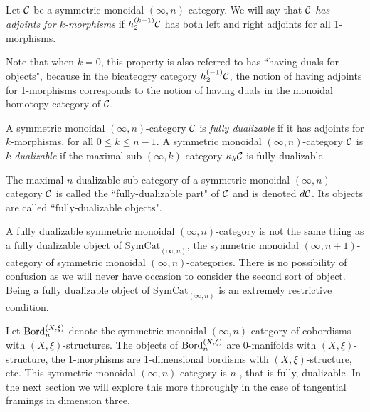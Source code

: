 \documentclass{amsart}
\begin{document}
\begin{definition}
	Let $\mathcal C$ be a symmetric monoidal $(\infty,n)$-category. We will say that $\mathcal C$ {\em has adjoints for $k$-morphisms} if $h^{(k-1)}_2 \mathcal C$ has both left and right adjoints for all 1-morphisms. 
\end{definition}
Note that when $k=0$, this property is also referred to has ``having duals for objects", because in the bicateogry category $h^{(-1)}_2 \mathcal C$, the notion of having adjoints for 1-morphisms corresponds to the notion of having duals in the monoidal homotopy category of $\mathcal C$.

\begin{definition}
A symmetric monoidal $(\infty,n)$-category $\mathcal C$ is \emph{fully dualizable} if it has adjoints for $k$-morphisms, for all $0 \leq k \leq n-1$.
A symmetric monoidal $(\infty,n)$-category $\mathcal C$ is \emph{$k$-dualizable} if the maximal sub-$(\infty,k)$-category $\kappa_k \mathcal C$ is fully dualizable.
\end{definition}



\noindent The maximal $n$-dualizable sub-category of a symmetric monoidal $(\infty,n)$-category $\mathcal C$ is called the ``fully-dualizable part" of $\mathcal C$ and is denoted $d\mathcal C$. Its objects are called ``fully-dualizable objects". 
\begin{warning}
	A fully dualizable symmetric monoidal $(\infty,n)$-category is not the same thing as a fully dualizable object of $\mathrm{SymCat}_{(\infty,n)}$, the symmetric monoidal $(\infty,n+1)$-category of symmetric monoidal $(\infty,n)$-categories. There is no possibility of confusion as we will never have occasion to consider the second sort of object. Being a fully dualizable object of $\mathrm{SymCat}_{(\infty,n)}$ is an extremely restrictive condition. 
\end{warning}

\begin{example}
	Let $\mathrm{Bord}^{(X,\xi)}_n$ denote the symmetric monoidal $(\infty,n)$-category of cobordisms with $(X,\xi)$-structures. The objects of $\mathrm{Bord}^{(X,\xi)}_n$ are 0-manifolds with $(X, \xi)$-structure, the 1-morphisms are 1-dimensional bordisms with $(X,\xi)$-structure, etc. This symmetric monoidal $(\infty,n)$-category is $n$-, that is fully, dualizable. In the next section we will explore this more thoroughly in the case of tangential framings in dimension three.  
\end{example}
\end{document}
